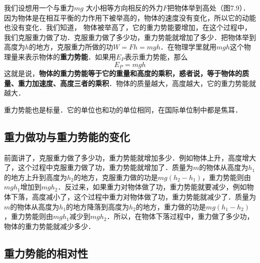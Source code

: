 我们设想用一个与重力$mg$
大小相等方向相反的外力$F$把物体举到高处（图7.9）．因为物体是在相互平衡的力作用下被举高的，物体的速度没有变化，所以它的动能也没有变化．我们知道，
物体被举高了，它的重力势能要增加，在这个过程中，我们克服重力做了功．克服重力做了多少功，重力势能就增加了多少．把物体举到高度为$h$的地方，克服重力所做的功$W=Fh=mgh$．在物理学里就用$mgh$这个物理量来表示物体的\textbf{重力势能}．如果用$E_P$表示重力势能，那么
\[E_P =mgh\]
这就是说，\textbf{物体的重力势能等于它的重量和高度的乘积，惑者说，等于物体的质量、重力加速度、高度三者的乘积}．物体的质量越大，高度越大，它的重力势能就越大．

重力势能也是标量．它的单位也和功的单位相同，在国际单位制中都是焦耳．

\subsection{重力做功与重力势能的变化}

前面讲了，克服重力做了多少功，重力势能就增加多少．例如物体上升，高度增大了，这个过程中克服重力做了功，重力势能就增加了．质量为$m$的物体从高度为$h_1$的地方上升到高度为$h_2$的地方，克服重力做的功是$mg(h_2-h_1)$，重力势能则由$mgh_1$增加到$mgh_2$．反过来，如果重力对物体做了功，重力势能就要减少，例如物体下落，高度减小了，这个过程中重力对物体做了功，重力势能就减少了．质量为$m$的物体从高度为$h_1$的地方降落到高度为$h_2$的地方，重力做的功是$mg(h_1-h_2)$，重力势能则由$mgh_1$减少到$mgh_2$．所以，在物体下落过程中，重力做了多少功，物体的重力势能就减少多少．

\subsection{重力势能的相对性}

